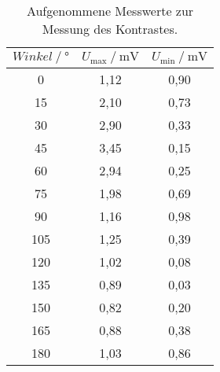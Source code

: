 \begin{table}[H] 
   \centering 
   \caption{Aufgenommene Messwerte zur Messung des Kontrastes.} 
   \label{tab:Kontrast} 
   \begin{tabular} { c c c } 
 \toprule 
 {$Winkel\:/\: \mathrm{°}$} & {$U_\text{max}\:/\: \mathrm{mV}$} & {$U_\text{min}\:/\: \mathrm{mV}$} \\ 
    \midrule 
    0 & 1,12 & 0,90 \\ 
    15 & 2,10 & 0,73 \\ 
    30 & 2,90 & 0,33 \\ 
    45 & 3,45 & 0,15 \\ 
    60 & 2,94 & 0,25 \\ 
    75 & 1,98 & 0,69 \\ 
    90 & 1,16 & 0,98 \\ 
    105 & 1,25 & 0,39 \\ 
    120 & 1,02 & 0,08 \\ 
    135 & 0,89 & 0,03 \\ 
    150 & 0,82 & 0,20 \\ 
    165 & 0,88 & 0,38 \\ 
    180 & 1,03 & 0,86 \\ 
    \bottomrule 
  \end{tabular}
\end{table}
